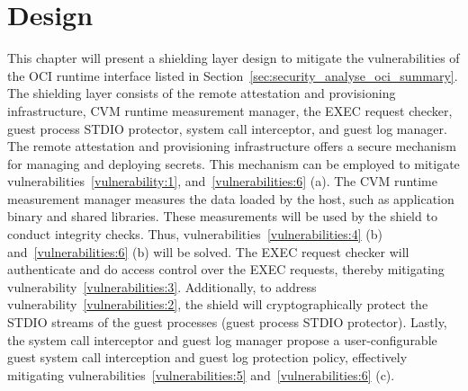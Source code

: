 \chapter{Design}
\label{sec:design}




This chapter will present a shielding layer design to mitigate the vulnerabilities of the OCI runtime interface listed in Section~\ref{sec:security_analyse_oci_summary}. The shielding layer consists of the remote attestation and provisioning infrastructure, CVM runtime measurement manager, the EXEC request checker, 
guest process STDIO protector, system call interceptor, and guest log manager. The remote attestation and provisioning infrastructure offers a secure mechanism for managing and deploying secrets. This mechanism can be employed to mitigate vulnerabilities~\ref{vulnerability:1}, and~\ref{vulnerabilities:6} (a). The CVM runtime measurement manager measures the data 
loaded by the host, such as application binary and shared libraries. These measurements will be used by the shield to conduct integrity checks. Thus, vulnerabilities~\ref{vulnerabilities:4} (b) and~\ref{vulnerabilities:6} (b)  will be solved. The EXEC request checker will authenticate and do access control over the EXEC 
requests, thereby mitigating vulnerability~\ref{vulnerabilities:3}. Additionally, to address vulnerability~\ref{vulnerabilities:2}, the shield will cryptographically protect the STDIO streams of the guest processes (guest process STDIO protector). Lastly, the system call interceptor and guest log manager propose 
a user-configurable guest system call interception and guest log protection policy,  effectively mitigating vulnerabilities~\ref{vulnerabilities:5} and~\ref{vulnerabilities:6} (c).

